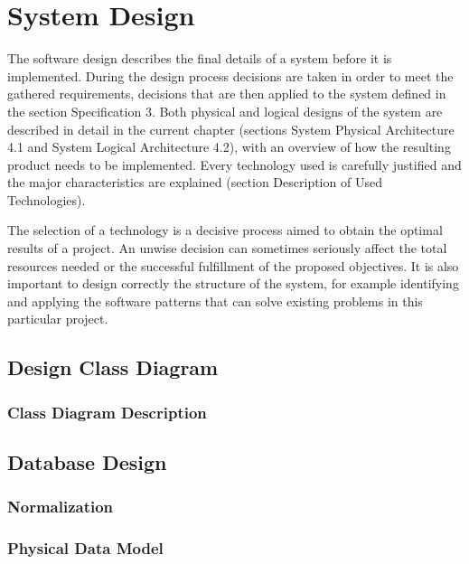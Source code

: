 \chapter{System Design}

The software design describes the final details of a system before it is implemented. During the design process decisions are taken in order to meet the gathered requirements, decisions that are then applied to the system defined in the section Specification 3. Both physical and logical designs of the system are described in detail in the current chapter (sections System Physical Architecture 4.1 and System Logical Architecture 4.2), with an overview of how the resulting product needs to be implemented. Every technology used is carefully justified and the major characteristics are explained (section Description of Used Technologies).

The selection of a technology is a decisive process aimed to obtain the optimal results of a project. An unwise decision can sometimes seriously affect the total resources needed or the successful fulfillment of the proposed objectives. It is also important to design correctly the structure of the system, for example identifying and applying the software patterns that can solve existing problems in this particular project.

\section{Design Class Diagram}

\subsection{Class Diagram Description}

\section{Database Design}
\subsection{Normalization}

\subsection{Physical Data Model}



